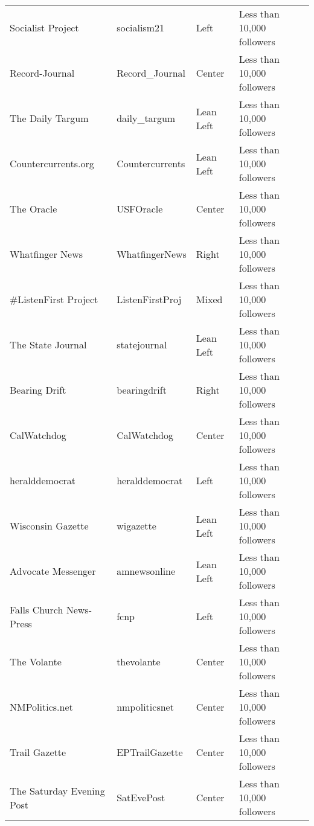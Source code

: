 \begin{tabular}{llll}
         Socialist Project &      socialism21 &          Left &                Less than 10,000 followers \\
            Record-Journal &   Record\_Journal &        Center &                Less than 10,000 followers \\
          The Daily Targum &     daily\_targum &     Lean Left &                Less than 10,000 followers \\
       Countercurrents.org &  Countercurrents &     Lean Left &                Less than 10,000 followers \\
                The Oracle &        USFOracle &        Center &                Less than 10,000 followers \\
           Whatfinger News &   WhatfingerNews &         Right &                Less than 10,000 followers \\
      \#ListenFirst Project &  ListenFirstProj &         Mixed &                Less than 10,000 followers \\
         The State Journal &     statejournal &     Lean Left &                Less than 10,000 followers \\
             Bearing Drift &     bearingdrift &         Right &                Less than 10,000 followers \\
               CalWatchdog &      CalWatchdog &        Center &                Less than 10,000 followers \\
            heralddemocrat &   heralddemocrat &          Left &                Less than 10,000 followers \\
         Wisconsin Gazette &        wigazette &     Lean Left &                Less than 10,000 followers \\
        Advocate Messenger &     amnewsonline &     Lean Left &                Less than 10,000 followers \\
   Falls Church News-Press &             fcnp &          Left &                Less than 10,000 followers \\
               The Volante &       thevolante &        Center &                Less than 10,000 followers \\
            NMPolitics.net &    nmpoliticsnet &        Center &                Less than 10,000 followers \\
             Trail Gazette &   EPTrailGazette &        Center &                Less than 10,000 followers \\
 The Saturday Evening Post &       SatEvePost &        Center &                Less than 10,000 followers \\

\end{tabular}
